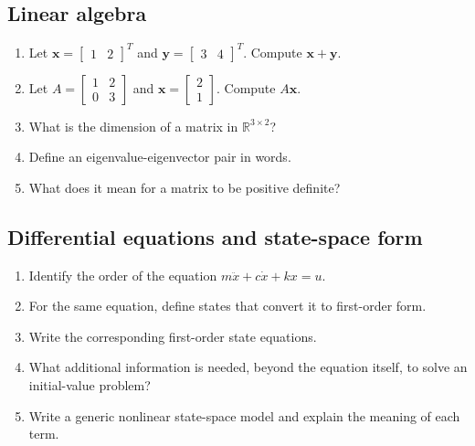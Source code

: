 \documentclass[11pt]{article}
\newcommand{\vect}[1]{\boldsymbol{#1}}
\newcommand{\R}{\mathbb{R}}
\begin{document}
\subsection*{Linear algebra}
\begin{enumerate}[leftmargin=1.5em,label=\textbf{P\arabic*.},resume]
  \item Let $\vect{x}=\begin{bmatrix}1 & 2\end{bmatrix}^{T}$ and $\vect{y}=\begin{bmatrix}3 & 4\end{bmatrix}^{T}$. Compute $\vect{x}+\vect{y}$.
  \item Let $A=\begin{bmatrix}1 & 2\\0 & 3\end{bmatrix}$ and $\vect{x}=\begin{bmatrix}2\\1\end{bmatrix}$. Compute $A\vect{x}$.
  \item What is the dimension of a matrix in $\R^{3\times 2}$?
  \item Define an eigenvalue-eigenvector pair in words.
  \item What does it mean for a matrix to be positive definite?
\end{enumerate}

\subsection*{Differential equations and state-space form}
\begin{enumerate}[leftmargin=1.5em,label=\textbf{P\arabic*.},resume]
  \item Identify the order of the equation $m\ddot{x}+c\dot{x}+kx=u$.
  \item For the same equation, define states that convert it to first-order form.
  \item Write the corresponding first-order state equations.
  \item What additional information is needed, beyond the equation itself, to solve an initial-value problem?
  \item Write a generic nonlinear state-space model and explain the meaning of each term.
\end{enumerate}
\end{document}
